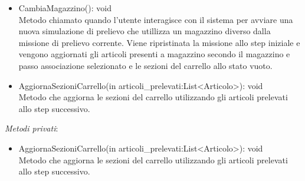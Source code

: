 \begin{itemize}
    \item CambiaMagazzino(): void\\
    Metodo chiamato quando l'utente interagisce con il sistema per avviare una nuova simulazione di prelievo che utillizza un magazzino diverso dalla missione di prelievo corrente.
    Viene ripristinata la missione allo step iniziale e vengono aggiornati gli articoli presenti a magazzino secondo il magazzino e passo associazione selezionato e le sezioni del carrello allo stato vuoto.
    \item AggiornaSezioniCarrello(in articoli\_prelevati:List<Articolo>): void\\
    Metodo che aggiorna le sezioni del carrello utilizzando gli articoli prelevati allo step successivo. 
\end{itemize} 
\textit{Metodi privati}:\\
\begin{itemize}
    \item AggiornaSezioniCarrello(in articoli\_prelevati:List<Articolo>): void\\
    Metodo che aggiorna le sezioni del carrello utilizzando gli articoli prelevati allo step successivo. 
\end{itemize}

